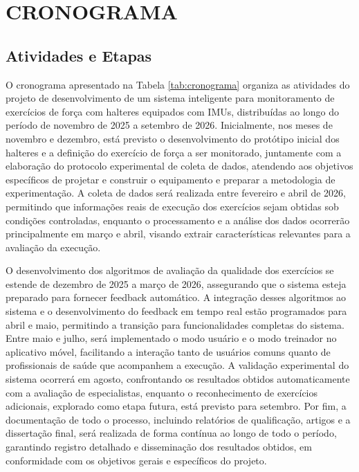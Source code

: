 \chapter{CRONOGRAMA}
\label{cap:cronograma}

\section{Atividades e Etapas}

O cronograma apresentado na Tabela \ref{tab:cronograma} organiza as atividades do projeto de desenvolvimento de um sistema inteligente para monitoramento de exercícios de força com halteres equipados com IMUs, distribuídas ao longo do período de novembro de 2025 a setembro de 2026. Inicialmente, nos meses de novembro e dezembro, está previsto o desenvolvimento do protótipo inicial dos halteres e a definição do exercício de força a ser monitorado, juntamente com a elaboração do protocolo experimental de coleta de dados, atendendo aos objetivos específicos de projetar e construir o equipamento e preparar a metodologia de experimentação. A coleta de dados será realizada entre fevereiro e abril de 2026, permitindo que informações reais de execução dos exercícios sejam obtidas sob condições controladas, enquanto o processamento e a análise dos dados ocorrerão principalmente em março e abril, visando extrair características relevantes para a avaliação da execução.

O desenvolvimento dos algoritmos de avaliação da qualidade dos exercícios se estende de dezembro de 2025 a março de 2026, assegurando que o sistema esteja preparado para fornecer feedback automático. A integração desses algoritmos ao sistema e o desenvolvimento do feedback em tempo real estão programados para abril e maio, permitindo a transição para funcionalidades completas do sistema. Entre maio e julho, será implementado o modo usuário e o modo treinador no aplicativo móvel, facilitando a interação tanto de usuários comuns quanto de profissionais de saúde que acompanhem a execução. A validação experimental do sistema ocorrerá em agosto, confrontando os resultados obtidos automaticamente com a avaliação de especialistas, enquanto o reconhecimento de exercícios adicionais, explorado como etapa futura, está previsto para setembro. Por fim, a documentação de todo o processo, incluindo relatórios de qualificação, artigos e a dissertação final, será realizada de forma contínua ao longo de todo o período, garantindo registro detalhado e disseminação dos resultados obtidos, em conformidade com os objetivos gerais e específicos do projeto.

